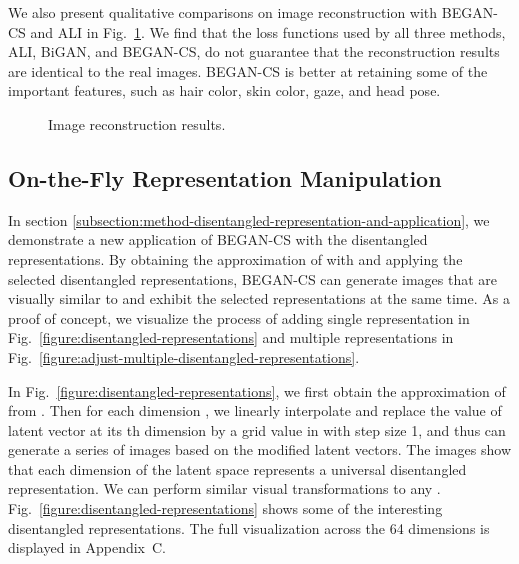 \documentclass[runningheads]{llncs}
\begin{document}
    We also present qualitative comparisons on image reconstruction with BEGAN-CS and ALI in Fig.~\ref{Figure:Compare_With_ALI}. We find that the loss functions used by all three methods, ALI, BiGAN, and BEGAN-CS, do not guarantee that the reconstruction results are identical to the real images. BEGAN-CS is better at retaining some of the important features, such as hair color, skin color, gaze, and head pose.
    
    \begin{figure}[!t]
        \centering
        \setlength{\tabcolsep}{2pt}
        \caption{Image reconstruction results.}
        \label{Figure:Compare_With_ALI}
    \end{figure}
    
    
    
    \subsection{On-the-Fly Representation Manipulation}
    
    
    In section \ref{subsection:method-disentangled-representation-and-application}, we demonstrate a new application of BEGAN-CS with the disentangled representations. By obtaining the approximation of  with  and applying  the selected disentangled representations, BEGAN-CS can generate images that are visually similar to  and exhibit the selected representations at the same time. As a proof of concept, we visualize the process of adding single representation in Fig.~\ref{figure:disentangled-representations} and multiple representations in Fig.~\ref{figure:adjust-multiple-disentangled-representations}.
    
    In Fig.~\ref{figure:disentangled-representations}, we first obtain the approximation of  from . Then for each dimension , we linearly interpolate and replace the value of latent vector  at its th dimension by a grid value in  with step size 1, and thus can generate a series of images based on the modified latent vectors. The images show that each dimension of the latent space  represents a universal disentangled representation. We can perform similar visual transformations to any . Fig.~\ref{figure:disentangled-representations} shows some of the interesting disentangled representations. The full visualization across the 64 dimensions is displayed in Appendix~C.
    
\end{document}
